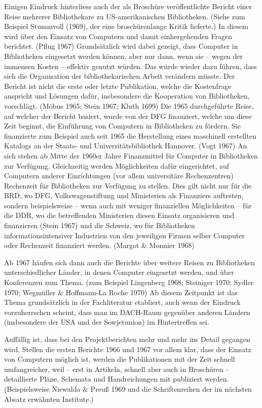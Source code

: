 \documentclass[a4paper,
fontsize=11pt,
oneside,
numbers=noperiodatend,
parskip=half-,
bibliography=totoc,
final
]{scrartcl}
\begin{document}
Einigen Eindruck hinterliess auch der als Broschüre veröffentlichte
Bericht einer Reise mehrerer Bibliothekare zu US-amerikanischen
Bibliotheken. (Siehe zum Beispiel Stummvoll (1969), der eine
broschürenlange Kritik lieferte.) In diesem wird über den Einsatz von
Computern und damit einhergehenden Fragen berichtet. (Pflug 1967)
Grundsätzlich wird dabei gezeigt, dass Computer in Bibliotheken
eingesetzt werden können, aber nur dann, wenn sie -- wegen der immensen
Kosten -- effektiv genutzt würden. Das würde wieder dazu führen, dass
sich die Organisation der bibliothekarischen Arbeit verändern müsste.
Der Bericht ist nicht die erste oder letzte Publikation, welche die
Kostenfrage anspricht und Lösungen dafür, insbesondere die Kooperation
von Bibliotheken, vorschlägt. (Möbus 1965; Stein 1967; Kluth 1699) Die
1965 durchgeführte Reise, auf welcher der Bericht basiert, wurde von der
DFG finanziert, welche um diese Zeit beginnt, die Einführung von
Computern in Bibliotheken zu fördern. Sie finanzierte zum Beispiel auch
seit 1965 die Herstellung eines maschinell erstellten Katalogs an der
Staats- und Universitätsbibliothek Hannover. (Vogt 1967) An sich stehen
ab Mitte der 1960er Jahre Finanzmittel für Computer in Bibliotheken zur
Verfügung. Gleichzeitig werden Möglichkeiten dafür eingerichtet, auf
Computern anderer Einrichtungen (vor allem universitäre Rechenzentren)
Rechenzeit für Bibliotheken zur Verfügung zu stellen. Dies gilt nicht
nur für die BRD, wo DFG, Volkswagenstiftung und Ministerien als
Finanziers auftreten, sondern beispielsweise -- wenn auch mit weniger
finanziellen Möglichkeiten -- für die DDR, wo die betreffenden
Ministerien diesen Einsatz organisieren und finanzieren (Stein 1967) und
die Schweiz, wo für Bibliotheken informationsintensiver Industrien von
den jeweiligen Firmen selber Computer oder Rechenzeit finanziert werden.
(Margot \& Monnier 1968)

Ab 1967 häufen sich dann auch die Berichte über weitere Reisen zu
Bibliotheken unterschiedlicher Länder, in denen Computer eingesetzt
werden, und über Konferenzen zum Thema. (zum Beispiel Lingenberg 1968;
Steiniger 1970; Sydler 1970; Wegmüller \& Hoffmann-La Roche 1970) Ab
diesem Zeitpunkt ist das Thema grundsätzlich in der Fachliteratur
etabliert, auch wenn der Eindruck vorzuherrschen scheint, dass man im
DACH-Raum gegenüber anderen Ländern (insbesondere der USA und der
Sowjetunion) im Hintertreffen sei.

Auffällig ist, dass bei den Projektberichten mehr und mehr ins Detail
gegangen wird. Stellen die ersten Berichte 1966 und 1967 vor allem klar,
dass der Einsatz von Computern möglich ist, werden die Publikationen mit
der Zeit schnell umfangreicher, weil -- erst in Artikeln, schnell aber
auch in Broschüren -- detaillierte Pläne, Schemata und Handreichungen
mit publiziert werden. (Beispielsweise Niewalda \& Preuß 1969 und die
Schriftenreihen der im nächsten Absatz erwähnten Institute.)
\end{document}
